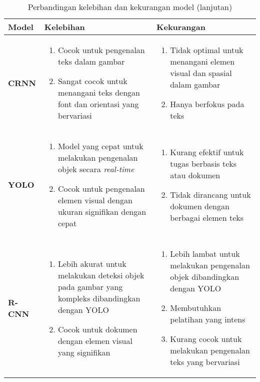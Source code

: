 \begin{table}[t!]
\ContinuedFloat %
\caption{Perbandingan kelebihan dan kekurangan model (lanjutan)}
\begin{tabularx}{\linewidth}{|p{2cm}|X|X|}
\hline
\textbf{Model} & \textbf{Kelebihan} & \textbf{Kekurangan} \\
\hline

\textbf{CRNN} &
\begin{enumerate}
    \item Cocok untuk pengenalan teks dalam gambar
    \item Sangat cocok untuk menangani teks dengan font dan orientasi yang bervariasi
\end{enumerate}
&
\begin{enumerate}
    \item Tidak optimal untuk menangani elemen visual dan spasial dalam gambar
    \item Hanya berfokus pada teks
\end{enumerate}
\\ \hline

\textbf{YOLO} &
\begin{enumerate}
    \item Model yang cepat untuk melakukan pengenalan objek secara \textit{real-time}
    \item Cocok untuk pengenalan elemen visual dengan ukuran signifikan dengan cepat
\end{enumerate}
&
\begin{enumerate}
    \item Kurang efektif untuk tugas berbasis teks atau dokumen
    \item Tidak dirancang untuk dokumen dengan berbagai elemen teks
\end{enumerate}
\\ \hline
\textbf{R-CNN} &
\begin{enumerate}
    \item Lebih akurat untuk melakukan deteksi objek pada gambar yang kompleks dibandingkan dengan \newline YOLO
    \item Cocok untuk dokumen dengan elemen visual yang signifikan
\end{enumerate}
&
\begin{enumerate}
    \item Lebih lambat untuk melakukan pengenalan objek dibandingkan dengan \newline YOLO
    \item Membutuhkan pelatihan yang intens
    \item Kurang cocok untuk melakukan pengenalan teks yang bervariasi
\end{enumerate}
\\ \hline
\end{tabularx}
\end{table}

